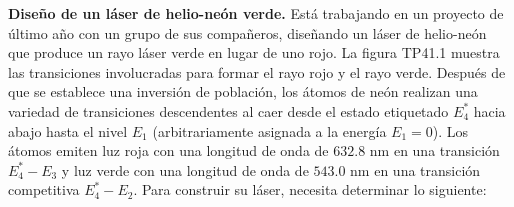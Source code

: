 \item \textbf{Diseño de un láser de helio-neón verde.}
Está trabajando en un proyecto de último año con un grupo de sus compañeros, diseñando un láser de helio-neón que produce un rayo láser verde en lugar de uno rojo. La figura TP41.1 muestra las transiciones involucradas para formar el rayo rojo y el rayo verde. Después de que se establece una inversión de población, los átomos de neón realizan una variedad de transiciones descendentes al caer desde el estado etiquetado $E_4^*$ hacia abajo hasta el nivel $E_1$ (arbitrariamente asignada a la energía $E_1 = 0$). Los átomos emiten luz roja con una longitud de onda de $632.8\text{ nm}$ en una transición $E_4^* - E_3$ y luz verde con una longitud de onda de $543.0\text{ nm}$ en una transición competitiva $E_4^* - E_2$. Para construir su láser, necesita determinar lo siguiente:


